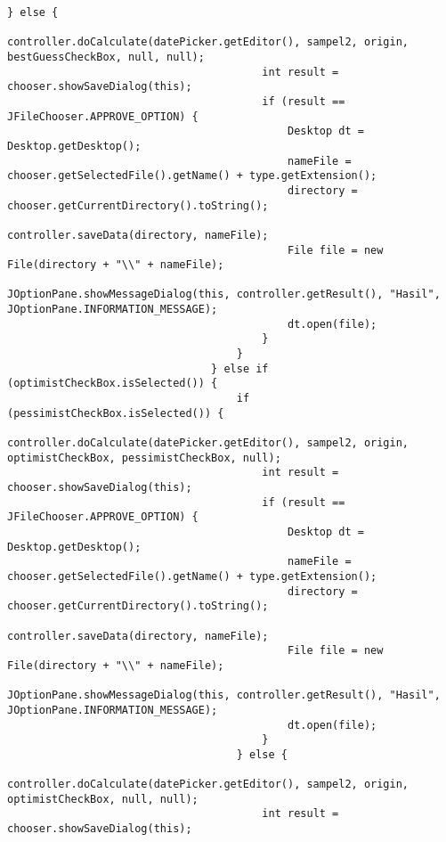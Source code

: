 \begin{lstlisting}[caption= main.java]
                                    } else {
                                        controller.doCalculate(datePicker.getEditor(), sampel2, origin, bestGuessCheckBox, null, null);
                                        int result = chooser.showSaveDialog(this);
                                        if (result == JFileChooser.APPROVE_OPTION) {
                                            Desktop dt = Desktop.getDesktop();
                                            nameFile = chooser.getSelectedFile().getName() + type.getExtension();
                                            directory = chooser.getCurrentDirectory().toString();
                                            controller.saveData(directory, nameFile);
                                            File file = new File(directory + "\\" + nameFile);
                                            JOptionPane.showMessageDialog(this, controller.getResult(), "Hasil", JOptionPane.INFORMATION_MESSAGE);
                                            dt.open(file);
                                        }
                                    }
                                } else if (optimistCheckBox.isSelected()) {
                                    if (pessimistCheckBox.isSelected()) {
                                        controller.doCalculate(datePicker.getEditor(), sampel2, origin, optimistCheckBox, pessimistCheckBox, null);
                                        int result = chooser.showSaveDialog(this);
                                        if (result == JFileChooser.APPROVE_OPTION) {
                                            Desktop dt = Desktop.getDesktop();
                                            nameFile = chooser.getSelectedFile().getName() + type.getExtension();
                                            directory = chooser.getCurrentDirectory().toString();
                                            controller.saveData(directory, nameFile);
                                            File file = new File(directory + "\\" + nameFile);
                                            JOptionPane.showMessageDialog(this, controller.getResult(), "Hasil", JOptionPane.INFORMATION_MESSAGE);
                                            dt.open(file);
                                        }
                                    } else {
                                        controller.doCalculate(datePicker.getEditor(), sampel2, origin, optimistCheckBox, null, null);
                                        int result = chooser.showSaveDialog(this);

\end{lstlisting}
